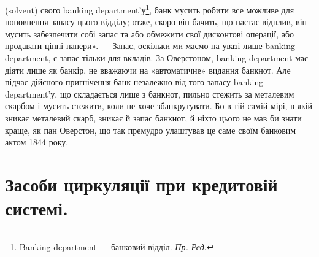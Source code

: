 \parcont{}  %
(solvent) свого banking department’у\footnote*{
Banking department — банковий відділ. \emph{Пр. Ред}.
}, банк мусить робити все можливе для поповнення запасу цього
відділу; отже, скоро він бачить, що настає відплив, він мусить забезпечити собі запас та або
обмежити свої дисконтові операції, або продавати цінні
напери». — Запас, оскільки ми маємо на увазі лише banking department, є запас
тільки для вкладів. За Оверстоном, banking department має діяти лише як банкір,
не вважаючи на «автоматичне» видання банкнот. Але підчас дійсного пригнічення
банк незалежно від того запасу banking department'у, що складається лише з
банкнот, пильно стежить за металевим скарбом і мусить стежити, коли не хоче
збанкрутувати. Бо в тій самій мірі, в якій зникає металевий скарб, зникає й
запас банкнот, й ніхто цього не мав би знати краще, як пан Оверстон, що так
премудро улаштував це саме своїм банковим актом 1844 року.

\section{Засоби циркуляції при кредитовій системі.}

